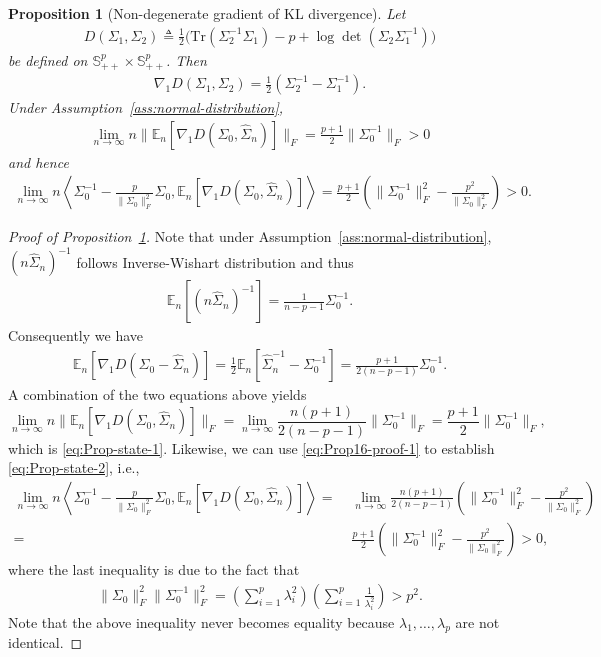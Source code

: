 \documentclass[11pt]{article}
\def\S{\mathbb{S}}
\def\la{\langle}
\def\ra{\rangle}
\newtheorem{proposition}{Proposition}
\newcommand{\bgeqn}{\begin{eqnarray}}
\newcommand{\edeqn}{\end{eqnarray}}
\newcommand{\bgeq}{\begin{eqnarray*}}
\newcommand{\edeq}{\end{eqnarray*}}
\newcommand{\Let}{\triangleq}
\def\S{\mathbb{S}}
\def\E {\mathbb{E}}
\def\tr{\mathrm{Tr}}
\def\la{\langle}
\def\PD{{\S^p_{++}}}
\def\ra{\rangle}
\newcommand{\wh}{\widehat}
\begin{document}
\begin{proposition}[Non-degenerate gradient of KL divergence]
\label{prop:KL-D'-limit}
    Let 
    \bgeqn 
    D(\Sigma_1, \Sigma_2) \Let \frac{1}{2}\big(\tr(\Sigma_2^{-1}\Sigma_1)-p+\log\det(\Sigma_2\Sigma_1^{-1})\big)
    \edeqn 
    be defined on $\PD \times \PD$. Then
    \bgeqn 
    {\nabla_1 D }(\Sigma_1, \Sigma_2) = \frac{1}{2}\left(\Sigma_2^{-1}-\Sigma_1^{-1}\right).
    \edeqn 
    Under Assumption~\ref{ass:normal-distribution}, 
    \bgeqn 
    \label{eq:Prop-state-1}
        \lim_{n\to\infty} n\|\E_n[{\nabla_1 D }(\Sigma_0, \wh\Sigma_n)]\|_F = \frac{p+1}{2}\|\Sigma_0^{-1}\|_F > 0
     \edeqn 
     and hence
     \bgeqn 
     \label{eq:Prop-state-2}
        \lim_{n\to\infty} n\left\la \Sigma_0^{-1}-\frac{p}{\|\Sigma_0\|_F^2}\Sigma_0, \E_n [{\nabla_1 D }(\Sigma_0, \wh\Sigma_n)]\right\ra=\frac{p+1}{2}\left(\|\Sigma_0^{-1}\|_F^2-\frac{p^2}{\|\Sigma_0\|_F^2}\right) > 0.
     \edeqn 
\end{proposition}
\begin{proof}[Proof of Proposition~\ref{prop:KL-D'-limit}]
    Note that under Assumption~\ref{ass:normal-distribution}, $
    (n\wh \Sigma_n)^{-1}$ follows Inverse-Wishart distribution and thus 
    \bgeq 
    \E_n[(n\wh \Sigma_n)^{-1}] = \frac{1}{n-p-1}\Sigma_0^{-1}.
    \edeq
    Consequently we have 
    \bgeqn 
      \label{eq:Prop16-proof-1}
        \E_n[{\nabla_1 D }(\Sigma_0-\wh \Sigma_n)] = \frac{1}{2}\E_n [\wh \Sigma_n^{-1}-\Sigma_0^{-1}] = \frac{p+1}{2(n-p-1)}\Sigma_0^{-1}.
    \edeqn 
    A combination of the two equations above yields 
    \[
        \lim_{n\to\infty} n\|\E_n[{\nabla_1 D }(\Sigma_0, \wh\Sigma_n)]\|_F = \lim_{n\to\infty} \frac{n(p+1)}{2(n-p-1)}\|\Sigma_0^{-1}\|_F = \frac{p+1}{2}\|\Sigma_0^{-1}\|_F,
     \]
     which is \eqref{eq:Prop-state-1}.
     Likewise, we can use \eqref{eq:Prop16-proof-1} to establish 
     \eqref{eq:Prop-state-2}, i.e.,
    \begin{align*}
        \lim_{n\to\infty} n\left\la \Sigma_0^{-1}-\frac{p}{\|\Sigma_0\|_F^2}\Sigma_0, \E_n [{\nabla_1 D }(\Sigma_0, \wh\Sigma_n)]\right\ra=\;& \lim_{n\to\infty} \frac{n(p+1)}{2(n-p-1)}\left(\|\Sigma_0^{-1}\|_F^2-\frac{p^2}{\|\Sigma_0\|_F^2}\right) \\=\;& \frac{p+1}{2}\left(\|\Sigma_0^{-1}\|_F^2-\frac{p^2}{\|\Sigma_0\|_F^2}\right) > 0,
    \end{align*}
    where the last inequality is due to the fact that 
    \begin{align*}
        \|\Sigma_0\|_F^2\|\Sigma_0^{-1}\|_F^2 = \left(\sum_{i=1}^p \lambda_i^2\right)\left(\sum_{i=1}^p \frac{1}{\lambda_i^2}\right) > p^2.
    \end{align*}
    Note that the above inequality never becomes equality because $\lambda_1,\ldots,\lambda_p$ are not identical. 
\end{proof}
\end{document}
